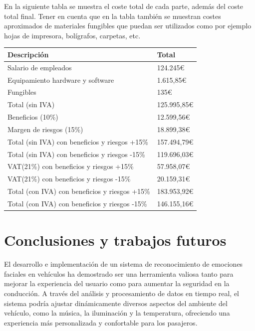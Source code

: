 \documentclass[12pt]{report} %
\begin{document}
En la siguiente tabla se muestra el coste total de cada parte, además del coste total final. Tener en cuenta que en la tabla también se muestran costes aproximados de materiales fungibles que puedan ser utilizados como por ejemplo hojas de impresora, bolígrafos, carpetas, etc.

\begin{table}[H]
	{
	  \begin{tabular}{|P{9cm}|P{4cm}|}
		\hline
		{\textbf{Descripción}} & {\textbf{Total}} \\
		\hline
		Salario de empleados & 124.245€ \\
		\hline
		Equipamiento hardware y software & 1.615,85€ \\
		\hline
		Fungibles & 135€ \\
		\hline
		Total (sin IVA) & 125.995,85€ \\
		\hline
		Beneficios (10\%) & 12.599,56€ \\
		\hline
		Margen de riesgos (15\%) & 18.899,38€ \\
		\hline
		Total (sin IVA) con beneficios y riesgos +15\% & 157.494,79€ \\
		\hline
		Total (sin IVA) con beneficios y riesgos -15\% & 119.696,03€ \\
		\hline
		VAT(21\%) con beneficios y riesgos +15\% & 57.958,07€ \\
		\hline
		VAT(21\%) con beneficios y riesgos -15\% & 20.159,31€ \\
		\hline
		Total (con IVA) con beneficios y riesgos +15\% & 183.953,92€ \\
		\hline
		Total (con IVA) con beneficios y riesgos -15\% & 146.155,16€ \\
		\hline
	  \end{tabular}
	}
\end{table}



\chapter{Conclusiones y trabajos futuros}

El desarrollo e implementación de un sistema de reconocimiento de emociones faciales en vehículos ha demostrado ser una herramienta valiosa tanto para mejorar la experiencia del usuario como para aumentar la seguridad en la conducción. A través del análisis y procesamiento de datos en tiempo real, el sistema podría ajustar dinámicamente diversos aspectos del ambiente del vehículo, como la música, la iluminación y la temperatura, ofreciendo una experiencia más personalizada y confortable para los pasajeros.
\end{document}
